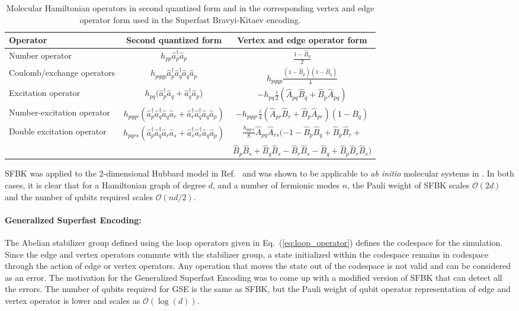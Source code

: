 \begin{table*}
\caption{Molecular Hamiltonian operators in second quantized form and in the corresponding vertex and edge operator form used in the Superfast Bravyi-Kitaev encoding.}
\begin{tabular}{ l | cc}
  \toprule			
Operator & Second quantized form & Vertex and edge operator form \\    \midrule
Number operator & $h_{pp} \hat{a}_p^\dagger \hat{a}_p$ & $\frac{1 - \hat{B}_p}{2}$ \\ 
Coulomb/exchange operators & $h_{pqqp} \hat{a}_p^\dagger \hat{a}_q^\dagger \hat{a}_q \hat{a}_p$ & $h_{pqqp} \frac{(1 - \hat{B}_p)(1 - \hat{B}_q)}{4}$ \\ 
Excitation operator & $h_{pq} (\hat{a}_p^\dagger \hat{a}_q + \hat{a}_q^\dagger \hat{a}_p$) & $-h_{pq} \frac{i}{2} (\hat{A}_{pq} \hat{B}_q + \hat{B}_p \hat{A}_{pq}) $ \\  
Number-excitation operator & $h_{pqqr} (\hat{a}_p^\dagger \hat{a}_q^\dagger \hat{a}_q \hat{a}_r + \hat{a}_r^\dagger \hat{a}_q^\dagger \hat{a}_q \hat{a}_p)$ & $- h_{pqqr} \frac{i}{4} (\hat{A}_{pr} \hat{B}_r + \hat{B}_p \hat{A}_{pr}) (1 - B_q) $ \\  
Double excitation operator & $h_{pqrs} (\hat{a}_p^\dagger \hat{a}_q^\dagger \hat{a}_r \hat{a}_s + \hat{a}_s^\dagger \hat{a}_r^\dagger \hat{a}_q \hat{a}_p)$ & $\frac{h_{pqrs}}{8} \hat{A}_{pq} \hat{A}_{rs} (-1 - \hat{B}_p \hat{B}_q + \hat{B}_p \hat{B}_r +$ \\ && $\hat{B}_p \hat{B}_s + \hat{B}_q \hat{B}_s - \hat{B}_r \hat{B}_s - \hat{B}_q + \hat{B}_p \hat{B}_r \hat{B}_s)$\\
  \bottomrule	
\end{tabular}
\label{tab:SFBKoperatortable}
\end{table*}

SFBK was applied to the 2-dimensional Hubbard model in Ref.~\cite{Havlek2017} and was shown to be applicable to \textit{ab initio} molecular systems in \cite{Setia2018}. In both cases, it is clear that for a Hamiltonian graph of degree $d$, and a number of fermionic modes $n$, the Pauli weight of SFBK scales $\mathcal{O}(2d)$ and the number of qubits required scales $\mathcal{O}(nd/2)$.

\paragraph{Generalized Superfast Encoding:}
The Abelian stabilizer group defined using the loop operators given in Eq.~(\ref{eq:loop_operator}) defines the codespace for the simulation. Since the edge and vertex operators commute with the stabilizer group, a state initialized within the codespace remains in codespace through the action of edge or vertex operators. Any operation that moves the state out of the codespace is not valid and can be considered as an error. 
The motivation for the Generalized Superfast Encoding was to come up with a modified version of SFBK that can detect all the errors. The number of qubits required for GSE is the same as SFBK, but the Pauli weight of qubit operator representation of edge and vertex operator is lower and scales as $\mathcal{O}(\log(d))$.

